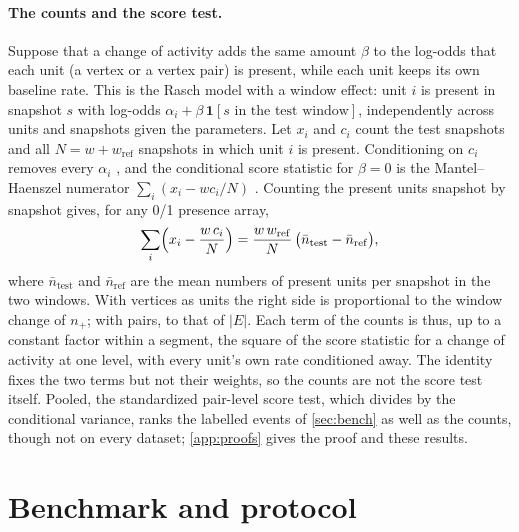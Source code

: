 \documentclass[11pt]{article}
\theoremstyle{dsplain}
\theoremstyle{definition}
\begin{document}
\paragraph{The counts and the score test.} Suppose that a change of activity adds the same amount $\beta$
to the log-odds that each unit (a vertex or a vertex pair) is present, while each unit keeps its own
baseline rate. This is the Rasch model \citep{rasch1960probabilistic} with a window effect: unit $i$ is
present in snapshot $s$ with log-odds $\alpha_i + \beta\,\mathbf 1[s \text{ in the test window}]$,
independently across units and snapshots given the parameters. Let $x_i$ and
$c_i$ count the test snapshots and all $N = w + w_{\mathrm{ref}}$ snapshots in which unit $i$ is present.
Conditioning on $c_i$ removes every $\alpha_i$ \citep{cox1958two,andersen1970asymptotic}, and the
conditional score statistic for $\beta = 0$ is the Mantel--Haenszel numerator $\sum_i (x_i - w c_i/N)$
\citep{mantel1959statistical}. Counting the present units snapshot by snapshot gives, for any 0/1 presence
array,
\begin{equation}
  \label{eq:score}
  \sum_i \Bigl(x_i - \frac{w\,c_i}{N}\Bigr) = \frac{w\,w_{\mathrm{ref}}}{N}\,
  \bigl(\bar n_{\mathrm{test}} - \bar n_{\mathrm{ref}}\bigr),
\end{equation}
where $\bar n_{\mathrm{test}}$ and $\bar n_{\mathrm{ref}}$ are the mean numbers of present units per
snapshot in the two windows. With vertices as units the right side is proportional to
the window change of $n_+$; with pairs, to that of $|E|$. Each term of the counts is thus, up to a
constant factor within a segment, the square of the score statistic for a change of activity at one level,
with every unit's own rate conditioned away. The identity
fixes the two terms but not their weights, so the counts are not the score test itself. Pooled, the
standardized pair-level score test, which divides by the conditional variance, ranks the labelled events of
\cref{sec:bench} as well as the counts, though not on every dataset; \cref{app:proofs} gives the proof and these results.

\section{Benchmark and protocol}
\label{sec:protocol}
\end{document}
